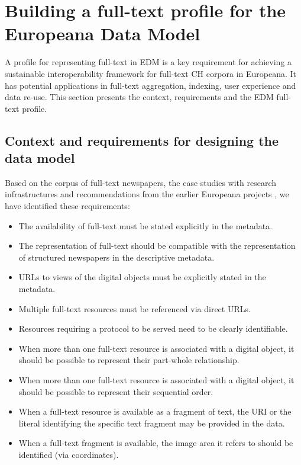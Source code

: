 \documentclass[a4paper,UKenglish,cleveref, autoref]{oasics-v2019}
\begin{document}
\section{Building a full-text profile for the Europeana Data Model}
\label{sec:buildingfulltextprofile}

A profile for representing full-text in EDM is a key requirement for achieving a sustainable interoperability framework for full-text CH corpora in Europeana. It has potential applications in full-text aggregation, indexing, user experience and data re-use. This section presents the context, requirements and the EDM full-text profile.

\subsection{Context and requirements for designing the data model}
\label{sec:contextandrequirements}

Based on the corpus of full-text newspapers, the case studies with research infrastructures and recommendations from the earlier Europeana projects \cite{Dunning15, Charles16}, we have identified these requirements:
\begin{itemize}
\item The availability of full-text must be stated explicitly in the metadata.
\item The representation of full-text should be compatible with the representation of structured newspapers in the descriptive metadata.
\item URLs to views of the digital objects must be explicitly stated in the metadata.
\item Multiple full-text resources must be referenced via direct URLs. 
\item Resources requiring a protocol to be served need to be clearly identifiable.
\item When more than one full-text resource is associated with a digital object, it should be possible to represent their part-whole relationship. 
\item When more than one full-text resource is associated with a digital object, it should be possible to represent their sequential order. 
\item When a full-text resource is available as a fragment of text, the URI or the literal identifying the specific text fragment may be provided in the data.
\item When a full-text fragment is available, the image area it refers to should be identified (via coordinates).
\end{itemize}
\end{document}
